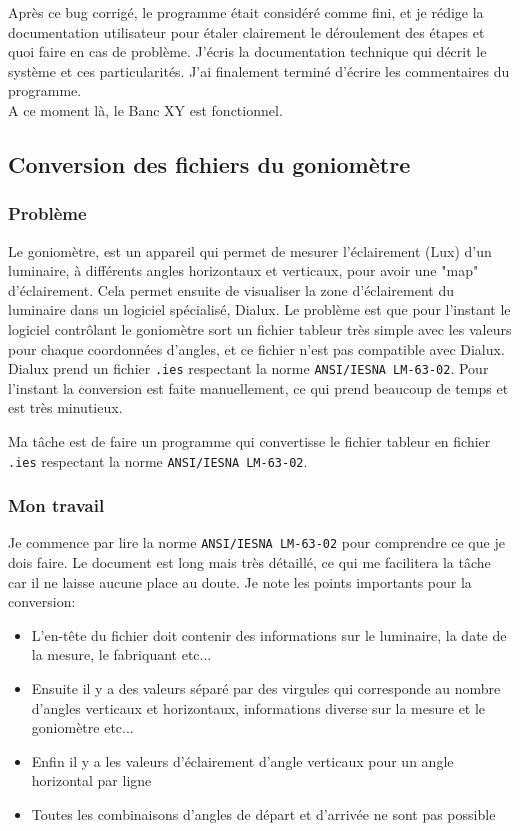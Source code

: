 \documentclass[12pt]{article}
\begin{document}
Après ce bug corrigé, le programme était considéré comme fini, et je rédige la documentation utilisateur pour étaler clairement le déroulement des étapes et quoi faire en cas de problème.
J'écris la documentation technique qui décrit le système et ces particularités.
J'ai finalement terminé d'écrire les commentaires du programme.\\
A ce moment là, le Banc XY est fonctionnel.

\newpage
\subsection{Conversion des fichiers du goniomètre }

\subsubsection{Problème}

Le goniomètre, est un appareil qui permet de mesurer l'éclairement (Lux) d'un luminaire, à différents angles horizontaux et verticaux, pour avoir une "map" d'éclairement.
Cela permet ensuite de visualiser la zone d'éclairement du luminaire dans un logiciel spécialisé, Dialux.
Le problème est que pour l'instant le logiciel contrôlant le goniomètre sort un fichier tableur très simple avec les valeurs pour chaque coordonnées d'angles, et ce fichier n'est pas compatible avec Dialux.
Dialux prend un fichier \verb|.ies| respectant la norme \verb|ANSI/IESNA LM-63-02|.
Pour l'instant la conversion est faite manuellement, ce qui prend beaucoup de temps et est très minutieux.

Ma tâche est de faire un programme qui convertisse le fichier tableur en fichier \verb|.ies| respectant la norme \verb|ANSI/IESNA LM-63-02|.


\subsubsection{ Mon travail  }

Je commence par lire la norme \verb|ANSI/IESNA LM-63-02| pour comprendre ce que je dois faire.
Le document est long mais très détaillé, ce qui me facilitera la tâche car il ne laisse aucune place au doute.
Je note les points importants pour la conversion:

\begin{itemize}
	\item L'en-tête du fichier doit contenir des informations sur le luminaire, la date de la mesure, le fabriquant etc...
	\item Ensuite il y a des valeurs séparé par des virgules qui corresponde au nombre d'angles verticaux et horizontaux, informations diverse sur la mesure et le goniomètre etc...
	\item Enfin il y a les valeurs d'éclairement d'angle verticaux pour un angle horizontal par ligne
	\item Toutes les combinaisons d'angles de départ et d'arrivée ne sont pas possible
\end{itemize}
\end{document}
